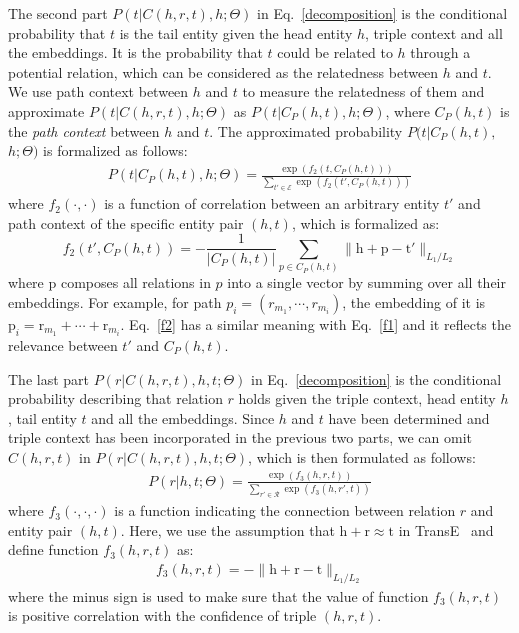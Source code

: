The second part $P(t|C(h,r,t),h;\Theta)$ in Eq.~\eqref{decomposition} is the conditional probability that $t$ is the tail entity given the head entity $h$, triple context and all the embeddings. It is the probability that $t$ could be related to $h$ through a potential relation, which can be considered as the relatedness between $h$ and $t$. We use path context between $h$ and $t$ to measure the relatedness of them and approximate $P(t|C(h,r,t),h;\Theta)$ as $P(t|C_P(h,t),h;\Theta)$, where $C_P(h,t)$ is the \emph{path context} between $h$ and $t$. The approximated probability $P(t|C_P(h,t),$ $h;\Theta)$ is formalized as follows:
\begin{align}\label{P_t}
  P(t|C_P(h,t),h;\Theta) = \frac{\exp(f_2(t,C_P(h,t)))}{\sum_{t' \in \mathcal{E}} \exp(f_2(t', C_P(h,t)))}
\end{align}
where $f_2(\cdot, \cdot)$ is a function of correlation between an arbitrary entity $t'$ and path context of the specific entity pair $(h,t)$, which is formalized as:
\begin{equation}\label{f2}
  f_2(t',C_P(h,t)) = -\frac{1}{|C_P(h,t)|}\sum_{p\in C_P(h,t)} \|\bm{\mathrm{h}} + \bm{\mathrm{p}} - \bm{\mathrm{t'}}\|_{L_1/L_2}
\end{equation}
where $\bm{\mathrm{p}}$ composes all relations in $p$ into a single vector by summing over all their embeddings. For example, for path $p_i=(r_{m_1}, \cdots, r_{m_i})$, the embedding of it is $\bm{\mathrm{p}}_i = \bm{\mathrm{r}}_{m_1} + \cdots + \bm{\mathrm{r}}_{m_i}$. Eq.~\eqref{f2} has a similar meaning with Eq.~\eqref{f1} and it reflects the relevance between $t'$ and $C_P(h,t)$.

The last part $P(r|C(h,r,t),h,t;\Theta)$ in Eq.~\eqref{decomposition} is the conditional probability describing that relation $r$ holds given the triple context, head entity $h$, tail entity $t$ and all the embeddings. Since $h$ and $t$ have been determined and triple context has been incorporated in the previous two parts, we can omit $C(h,r,t)$ in $P(r|C(h,r,t),h,t;\Theta)$, which is then formulated as follows:
\begin{align}\label{P_r}
  P(r|h,t;\Theta) = \frac{\exp(f_3(h,r,t))}{\sum_{r' \in \mathcal{R}} \exp(f_3(h,r',t))}
\end{align}
where $f_3(\cdot, \cdot, \cdot)$ is a function indicating the connection between relation $r$ and entity pair $(h,t)$. Here, we use the assumption that $\bm{\mathrm{h}} + \bm{\mathrm{r}} \approx \bm{\mathrm{t}}$ in TransE~\cite{BordesUGWY13} and define function $f_3(h,r,t)$ as:
\begin{align}\label{f3}
  f_3(h,r,t) = -\|\bm{\mathrm{h}} + \bm{\mathrm{r}} - \bm{\mathrm{t}}\|_{L_1/L_2}
\end{align}
where the minus sign is used to make sure that the value of function $f_3(h,r,t)$ is positive correlation with the confidence of triple $(h,r,t)$.


